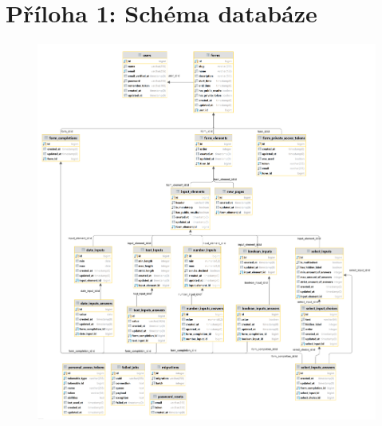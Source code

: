 \chapter{Příloha 1: Schéma databáze}
		\begin{figure}[hbtp]
			\centering %
			\includegraphics[height=0.61\paperheight]{img/appendix/db_diagram.png} %
			\label{fig:db_diagram} %
		\end{figure}
